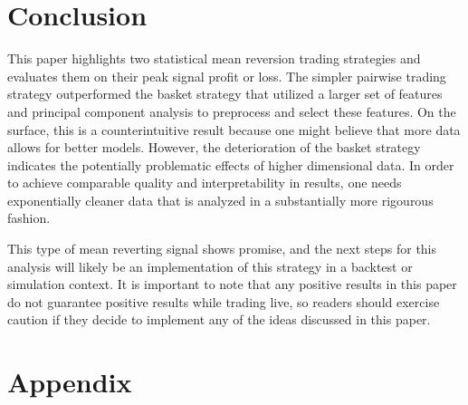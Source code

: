 \documentclass{article}
\begin{document}
\section{Conclusion}
This paper highlights two statistical mean reversion trading strategies and evaluates
them on their peak signal profit or loss. The simpler pairwise trading strategy 
outperformed the basket strategy that utilized a larger set of features and principal
component analysis to preprocess and select these features. On the surface, this is a
counterintuitive result because one might believe that more data allows for better 
models. However, the deterioration of the basket strategy indicates the potentially
problematic effects of higher dimensional data. In order to achieve comparable quality
and interpretability in results, one needs exponentially cleaner data that 
is analyzed in a substantially more rigourous fashion. 

This type of mean reverting signal shows promise, and the next steps for this 
analysis will likely be an implementation of this strategy in a backtest or 
simulation context. It is important to note that any positive results in this 
paper do not guarantee positive results while trading live, so readers should
exercise caution if they decide to implement any of the ideas discussed in this paper.

\newpage
\section{Appendix}
\end{document}
